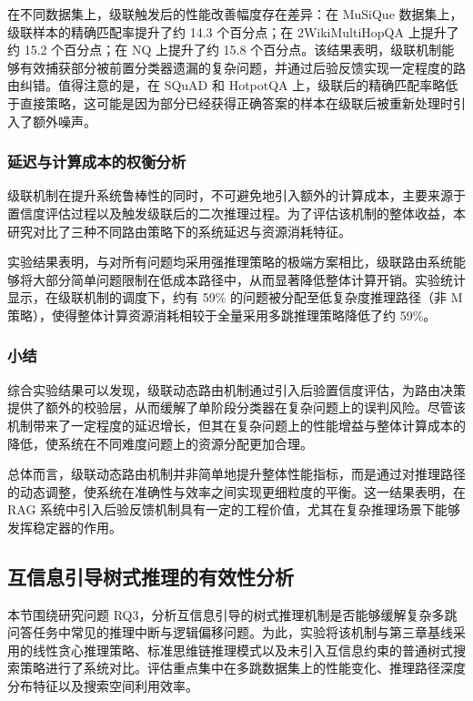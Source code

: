 
在不同数据集上，级联触发后的性能改善幅度存在差异：在 MuSiQue 数据集上，级联样本的精确匹配率提升了约 14.3 个百分点；在 2WikiMultiHopQA 上提升了约 15.2 个百分点；在 NQ 上提升了约 15.8 个百分点。该结果表明，级联机制能够有效捕获部分被前置分类器遗漏的复杂问题，并通过后验反馈实现一定程度的路由纠错。值得注意的是，在 SQuAD 和 HotpotQA 上，级联后的精确匹配率略低于直接策略，这可能是因为部分已经获得正确答案的样本在级联后被重新处理时引入了额外噪声。

\subsubsection{延迟与计算成本的权衡分析}

级联机制在提升系统鲁棒性的同时，不可避免地引入额外的计算成本，主要来源于置信度评估过程以及触发级联后的二次推理过程。为了评估该机制的整体收益，本研究对比了三种不同路由策略下的系统延迟与资源消耗特征。

实验结果表明，与对所有问题均采用强推理策略的极端方案相比，级联路由系统能够将大部分简单问题限制在低成本路径中，从而显著降低整体计算开销。实验统计显示，在级联机制的调度下，约有 59\% 的问题被分配至低复杂度推理路径（非 M 策略），使得整体计算资源消耗相较于全量采用多跳推理策略降低了约 59\%。

\subsubsection{小结}

综合实验结果可以发现，级联动态路由机制通过引入后验置信度评估，为路由决策提供了额外的校验层，从而缓解了单阶段分类器在复杂问题上的误判风险。尽管该机制带来了一定程度的延迟增长，但其在复杂问题上的性能增益与整体计算成本的降低，使系统在不同难度问题上的资源分配更加合理。

总体而言，级联动态路由机制并非简单地提升整体性能指标，而是通过对推理路径的动态调整，使系统在准确性与效率之间实现更细粒度的平衡。这一结果表明，在 RAG 系统中引入后验反馈机制具有一定的工程价值，尤其在复杂推理场景下能够发挥稳定器的作用。

\subsection{互信息引导树式推理的有效性分析}

本节围绕研究问题 RQ3，分析互信息引导的树式推理机制是否能够缓解复杂多跳问答任务中常见的推理中断与逻辑偏移问题。为此，实验将该机制与第三章基线采用的线性贪心推理策略、标准思维链推理模式以及未引入互信息约束的普通树式搜索策略进行了系统对比。评估重点集中在多跳数据集上的性能变化、推理路径深度分布特征以及搜索空间利用效率。

